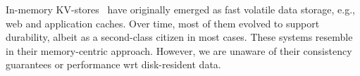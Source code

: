 
In-memory KV-stores~\cite{ignite, redis, memcached, Srinivasan:2016:AAR:3007263.3007276} have originally emerged as fast volatile 
data storage, e.g., web and application caches. Over time, most of them evolved to support durability,
albeit as a second-class citizen in most cases. 
These systems resemble \sys\/ in their memory-centric approach. 
However, we are unaware of their consistency guarantees or performance wrt disk-resident data. 

